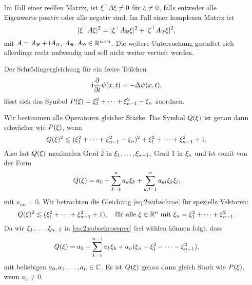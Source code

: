 \begin{exa}
Im Fall einer reellen Matrix, ist $\xi^\top A\xi\neq0$ für $\xi\neq0$,
falls entweder alle Eigenwerte positiv oder alle negativ sind.
Im Fall einer komplexen Matrix ist
\begin{equation}
\lvert\xi^\top A\xi\rvert^2=\lvert\xi^\top A_\Re\xi\rvert^2+\lvert\xi^\top A_\Im\xi\rvert^2,
\end{equation}
mit $A=A_\Re+\mathrm i A_\Im$, $A_\Re,A_\Im\in\mathbb R^{n\times n}$.
Die weitere Untersuchung gestaltet sich allerdings recht aufwendig
und soll nicht weiter vertieft werden.
\end{exa}

\begin{exa}\label{exa:2:schroe}
Der Schrödingergleichung für ein freies Teilchen
\begin{equation}
\mathrm i\frac{\partial}{\partial t}\psi(x,t)=-\Delta\psi(x,t),\end{equation}
lässt sich das Symbol $P(\xi)=\xi^2_1+\dots+\xi^2_{n-1}-\xi_n$ zuordnen.

Wir bestimmen alle Operatoren gleicher Stärke.
Das Symbol $Q(\xi)$ ist genau dann schwächer wie $P(\xi)$,
wenn
\begin{equation}\label{eq:2:subschroe}
Q(\x)^2\apprle(\x^2_1+\dots+\x^2_{n-1}-\x_n)^2+\x^2_1+\dots+\x^2_{n-1}+1.
\end{equation}
Also hat $Q(\xi)$ maximalen Grad 2 in $\xi_1,\dots,\xi_{n-1}$,
Grad 1 in $\xi_n$ und ist somit von der Form
\begin{equation}
Q(\xi)=a_0+\sum^n_{k=1}a_k\xi_k+\sum^n_{k,l=1}a_{kl}\xi_k\xi_l,
\end{equation}
mit $a_{nn}=0$.
Wir betrachten die Gleichung \eqref{eq:2:subschroe}
für spezielle Vektoren:
\begin{equation}\label{eq:2:subschroespec}
Q(\x)^2\apprle(\x^2_1+\dots+\x^2_{n-1}+1),
\quad\text{für alle}~\x\in\R^n~\text{mit}~\x_n=\x^2_1+\dots+\x^2_{n-1}.
\end{equation}
Da wir $\xi_1,\dots,\xi_{n-1}$ in \eqref{eq:2:subschroespec} frei wählen können folgt, dass
\begin{equation}
Q(\xi)=a_0+\sum_{k=1}^{n-1}a_k\xi_k+a_n(\xi_n-\xi^2_1-\dots-\xi^2_{n-1}),
\end{equation}
mit beliebigen $a_0,a_1,\dots,a_n\in\mathbb C$.
Es ist $Q(\xi)$ genau dann gleich Stark wie $P(\xi)$,
wenn $a_n\neq0$.
\end{exa}

